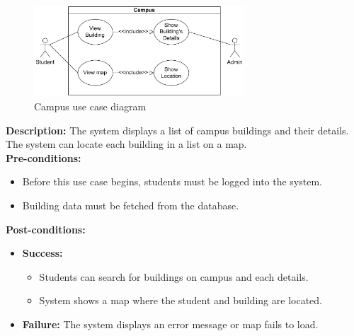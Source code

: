 \documentclass[12pt]{article}
\begin{document}
    \begin{figure}[H]
        \centering
        \includegraphics[width=0.7\textwidth]{image/CampusUseCase.pdf} 
        \caption{Campus use case diagram}
        \label{fig:campus_use_case}
    \end{figure}
    \textbf{Description:} The system displays a list of campus buildings and their details. The system can locate each building in a list on a map. \\

    \noindent \textbf{Pre-conditions:} 
        \begin{itemize}
            \item Before this use case begins, students must be logged into the system.
            \item Building data must be fetched from the database.
        \end{itemize}

    \noindent \textbf{Post-conditions:}
    \begin{itemize}
        \item \textbf{Success:} 
        \begin{itemize}
            \item Students can search for buildings on campus and each details.
            \item System shows a map where the student and building are located.
        \end{itemize}
        \item \textbf{Failure:} The system displays an error message or map fails to load.
    \end{itemize}
\end{document}
